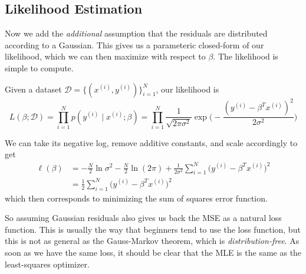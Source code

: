 \subsection{Likelihood Estimation}

  Now we add the \textit{additional} assumption that the residuals are distributed according to a Gaussian. This gives us a parameteric closed-form of our likelihood, which we can then maximize with respect to $\beta$. The likelihood is simple to compute. 

  \begin{lemma}[Likelihood]
    Given a dataset $\mathcal{D} = \{(x^{(i)}, y^{(i)})\}_{i=1}^N$, our likelihood is 
    \[L(\beta ; \mathcal{D}) = \prod_{i=1}^N p(y^{(i)} \mid x^{(i)}; \beta) = \prod_{i=1}^N \frac{1}{\sqrt{2 \pi \sigma^2}} \exp \bigg( -\frac{(y^{(i)} - \beta^T x^{(i)})^2}{2 \sigma^2} \bigg)\]
  \end{lemma} 

  \begin{theorem}
    We can take its negative log, remove additive constants, and scale accordingly to get 
    \begin{align}
      \ell (\beta) & = -\frac{N}{2} \ln{\sigma^2} - \frac{N}{2} \ln(2 \pi) + \frac{1}{2 \sigma^2} \sum_{i=1}^N \big(y^{(i)} - \beta^T x^{(i)} \big)^2 \\
      & =\frac{1}{2} \sum_{i=1}^N \big(y^{(i)} - \beta^T x^{(i)} \big)^2 
    \end{align}
    which then corresponds to minimizing the sum of squares error function. 
  \end{theorem}

  So assuming Gaussian residuals also gives us back the MSE as a natural loss function. This is usually the way that beginners tend to use the loss function, but this is not as general as the Gauss-Markov theorem, which is \textit{distribution-free}. As soon as we have the same loss, it should be clear that the MLE is the same as the least-squares optimizer. 


